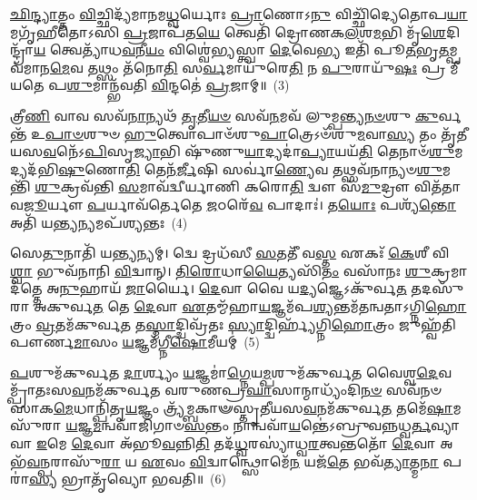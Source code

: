 \-\ul{𑌛𑌿}\-\-\ul{𑌨𑍍𑌦𑍍𑌯𑌾}\-𑌤𑍍𑌤𑌂 \ul{𑌵𑌿}\-𑌚𑍍𑌛𑌿𑌦𑍍𑌯᳴𑌮𑌾𑌨𑌮\-\ul{𑌧𑍍𑌵}\-𑌰𑍍𑌯𑍋𑌃 \ul{𑌪𑍍𑌰𑌾}\-𑌣𑍋\-𑌽\-\ul{𑌨𑍁} 𑌵𑌿𑌚𑍍𑌛𑌿᳴𑌦𑍍𑌯𑍇𑌤𑍋𑌪\-\ul{𑌯𑌾}\-𑌮𑌗𑍃᳴𑌹𑍀𑌤𑍋\-𑌽𑌸𑌿 \ul{𑌪𑍍𑌰}\-𑌜𑌾𑌪᳴𑌤\-\ul{𑌯𑍇} 𑌤𑍍𑌵𑍇𑌤𑌿᳴ 𑌦𑍍𑌰𑍋𑌣𑌕\-\ul{𑌲}\-𑌶\-\ul{𑌮}\-𑌭𑌿 𑌮𑍃᳴\-\ul{𑌶𑍇}\-𑌦𑌿𑌨𑍍𑌦𑍍𑌰𑌾᳴\-\ul{𑌯} 𑌤𑍍𑌵𑍇𑌤𑍍𑌯𑌾᳴𑌧\-\ul{𑌵}\-𑌨𑍀\-\ul{𑌯𑌂} 𑌵𑌿𑌶𑍍𑌵𑍇॑𑌭𑍍𑌯𑌸𑍍𑌤𑍍𑌵𑌾 \ul{𑌦𑍇}\-𑌵𑍇\-\ul{𑌭𑍍𑌯} 𑌇𑌤𑌿᳴ 𑌪𑍂\-\ul{𑌤}\-𑌭𑍃\-\ul{𑌤}\-𑌮𑍍𑌪𑌵᳴𑌮𑌾𑌨\-\ul{𑌮𑍇}\-𑌵 𑌤𑌥𑍍𑌸𑌂 𑌤᳴𑌨𑍋\-\ul{𑌤𑌿} 𑌸\-\ul{𑌰𑍍𑌵}\-𑌮𑌾𑌯𑍁᳴𑌰𑍇\-\ul{𑌤𑌿} 𑌨 \ul{𑌪𑍁}\-𑌰𑌾𑌯𑍁᳴\-\ul{𑌷𑌃} 𑌪𑍍𑌰 𑌮𑍀᳴𑌯𑌤𑍇 𑌪\-\ul{𑌶𑍁}\-𑌮𑌾𑌨𑍍𑌭᳴𑌵𑌤𑌿 \ul{𑌵𑌿}\-𑌨𑍍𑌦𑌤𑍇॑ \ul{𑌪𑍍𑌰}\-𑌜𑌾𑌮𑍍॥~(3)

{\anuvakamend[{\-\ul{𑌏}\-𑌤𑍇 𑌵𑌿 𑌦𑍍𑌵𑌿𑌚᳴𑌤𑍍𑌵𑌾𑌰𑌿𑍞𑌶𑌚𑍍𑌚}]}%

𑌤𑍍𑌰𑍀\-\ul{𑌣𑌿} 𑌵𑌾𑌵 𑌸𑌵᳴\-\ul{𑌨𑌾}\-𑌨𑍍𑌯𑌥᳴ \ul{𑌤𑍃}\-𑌤𑍀\-\ul{𑌯}\-\-\ul{𑍞} 𑌸𑌵᳴\-\ul{𑌨}\-𑌮𑌵᳴ 𑌲𑍁𑌮𑍍𑌪𑌨𑍍𑌤𑍍𑌯\-\ul{𑌨}\-\-\ul{𑍞}\-𑌶𑍁 \ul{𑌕𑍁}\-𑌰𑍍𑌵𑌨𑍍𑌤᳴ 𑌉\-\ul{𑌪𑌾}\-\-\ul{𑍞}\-𑌶𑍁𑍞 \ul{𑌹𑍁}\-𑌤𑍍𑌵𑍋𑌪𑌾𑍞᳴𑌶𑍁\-\ul{𑌪𑌾}\-𑌤𑍍𑌰𑍇\-𑌽𑍞᳴𑌶𑍁\-\ul{𑌮}\-𑌵𑌾\-\ul{𑌸𑍍𑌯} 𑌤𑌂 𑌤𑍃᳴𑌤𑍀𑌯𑌸\-\ul{𑌵}\-𑌨𑍇᳴\-𑌽\-\ul{𑌪𑌿}\-𑌸𑍃\-\ul{𑌜𑍍𑌯𑌾}\-𑌭𑌿 𑌷𑍁᳴𑌣𑍁\-\ul{𑌯𑌾}\-𑌦𑍍𑌯𑌦𑌾॑\-\ul{𑌪𑍍𑌯𑌾}\-𑌯𑌯᳴\-\ul{𑌤𑌿} 𑌤𑍇𑌨𑌾𑍞᳴\-\ul{𑌶𑍁}\-𑌮𑌦𑍍𑌯𑌦᳴𑌭𑌿\-\ul{𑌷𑍁}\-𑌣𑍋\-\ul{𑌤𑌿} 𑌤𑍇𑌨᳴\-\ul{𑌰𑍍𑌜𑍀}\-𑌷𑌿 𑌸𑌰𑍍𑌵𑌾॑\-\ul{𑌣𑍍𑌯𑍇}\-𑌵 𑌤𑌥𑍍𑌸𑌵᳴𑌨𑌾𑌨𑍍𑌯𑍞\-\ul{𑌶𑍁}\-𑌮𑌨𑍍𑌤𑌿᳴ \ul{𑌶𑍁}\-𑌕𑍍𑌰𑌵᳴𑌨𑍍𑌤𑌿 \ul{𑌸}\-𑌮𑌾𑌵᳴𑌦𑍍𑌵𑍀𑌰𑍍𑌯𑌾𑌣𑌿 𑌕𑌰𑍋\-\ul{𑌤𑌿} 𑌦𑍍𑌵𑍗 𑌸᳴\-\ul{𑌮𑍁}\-𑌦𑍍𑌰𑍗 𑌵𑌿𑌤᳴𑌤𑌾𑌵\-\ul{𑌜𑍂}\-𑌰𑍍𑌯𑍗 \ul{𑌪}\-𑌰𑍍𑌯𑌾𑌵᳴𑌰𑍍𑌤𑍇𑌤𑍇 \ul{𑌜}\-𑌠𑌰𑍇᳴\-\ul{𑌵} 𑌪𑌾𑌦𑌾𑌃॑। 𑌤\-\ul{𑌯𑍋𑌃} 𑌪𑌶𑍍𑌯᳴\-\ul{𑌨𑍍𑌤𑍋} 𑌅𑌤𑌿᳴ 𑌯\-\ul{𑌨𑍍𑌤𑍍𑌯}\-𑌨𑍍𑌯𑌮𑌪᳴𑌶𑍍𑌯𑌨𑍍𑌤𑌃~(4)

𑌸𑍇\-\ul{𑌤𑍁}\-𑌨𑌾𑌤𑌿᳴ 𑌯\-\ul{𑌨𑍍𑌤𑍍𑌯}\-𑌨𑍍𑌯𑌮𑍍। 𑌦𑍍𑌵𑍇 𑌦𑍍𑌰𑌧᳴𑌸𑍀 \ul{𑌸}\-𑌤𑌤𑍀᳴ 𑌵\-\ul{𑌸𑍍𑌤} 𑌏𑌕𑌃᳴ \ul{𑌕𑍇}\-𑌶𑍀 𑌵𑌿\-\ul{𑌶𑍍𑌵𑌾} 𑌭𑍁𑌵᳴𑌨𑌾𑌨𑌿 \ul{𑌵𑌿}\-𑌦𑍍𑌵𑌾𑌨𑍍। \ul{𑌤𑌿}\-\-\ul{𑌰𑍋}\-𑌧𑌾\-\ul{𑌯𑍈}\-𑌤𑍍𑌯𑌸𑌿᳴\-\ul{𑌤𑌂} 𑌵𑌸𑌾᳴𑌨𑌃 \ul{𑌶𑍁}\-𑌕𑍍𑌰𑌮𑌾 𑌦᳴𑌤𑍍𑌤𑍇 𑌅\-\ul{𑌨𑍁}\-𑌹𑌾𑌯᳴ \ul{𑌜𑌾}\-𑌰𑍍𑌯𑍈। \ul{𑌦𑍇}\-𑌵𑌾 𑌵𑍈 𑌯\-\ul{𑌦𑍍𑌯}\-𑌜𑍍𑌞𑍇\-𑌽𑌕𑍁᳴𑌰𑍍𑌵\-\ul{𑌤} 𑌤𑌦𑌸𑍁᳴𑌰𑌾 𑌅𑌕𑍁𑌰𑍍𑌵\-\ul{𑌤} 𑌤𑍇 \ul{𑌦𑍇}\-𑌵𑌾 \ul{𑌏}\-𑌤𑌮𑍍𑌮᳴𑌹𑌾\-\ul{𑌯}\-𑌜𑍍𑌞𑌮᳴𑌪\-\ul{𑌶𑍍𑌯}\-𑌨𑍍𑌤𑌮᳴𑌤𑌨𑍍𑌵𑌤𑌾\-𑌽\-𑌗𑍍𑌨𑌿\-\ul{𑌹𑍋}\-𑌤𑍍𑌰𑌂 \ul{𑌵𑍍𑌰}\-𑌤𑌮᳴𑌕𑍁𑌰𑍍𑌵\-\ul{𑌤} 𑌤\-\ul{𑌸𑍍𑌮𑌾}\-𑌦𑍍𑌦𑍍𑌵𑌿𑌵𑍍𑌰᳴𑌤𑌃 \ul{𑌸𑍍𑌯𑌾}\-𑌦𑍍𑌦𑍍𑌵𑌿𑌰𑍍\mbox{}𑌹𑍍𑌯᳴𑌗𑍍𑌨𑌿\-\ul{𑌹𑍋}\-𑌤𑍍𑌰𑌂 𑌜𑍁𑌹𑍍𑌵᳴𑌤𑌿 𑌪𑍗𑌰𑍍𑌣\-\ul{𑌮𑌾}\-𑌸𑌂 \ul{𑌯}\-𑌜𑍍𑌞𑌮᳴𑌗𑍍𑌨𑍀\-\ul{𑌷𑍋}\-𑌮𑍀𑌯𑌮𑍍॑~(5)

\-\ul{𑌪}\-𑌶𑍁𑌮᳴𑌕𑍁𑌰𑍍𑌵𑌤 \ul{𑌦𑌾}\-𑌰𑍍𑌶𑍍𑌯𑌂 \ul{𑌯}\-𑌜𑍍𑌞𑌮𑌾॑\-\ul{𑌗𑍍𑌨𑍇}\-𑌯\-\ul{𑌮𑍍𑌪}\-𑌶𑍁𑌮᳴𑌕𑍁𑌰𑍍𑌵𑌤 𑌵𑍈𑌶𑍍𑌵\-\ul{𑌦𑍇}\-𑌵𑌮𑍍𑌪𑍍𑌰𑌾᳴𑌤𑌃𑌸\-\ul{𑌵}\-𑌨𑌮᳴𑌕𑍁𑌰𑍍𑌵𑌤 𑌵𑌰𑍁𑌣𑌪𑍍𑌰\-\ul{𑌘𑌾}\-𑌸𑌾𑌨𑍍𑌮𑌾𑌧𑍍𑌯𑌂᳴𑌦𑌿\-\ul{𑌨}\-\-\ul{𑍞} 𑌸𑌵᳴𑌨𑍞 𑌸𑌾𑌕\-\ul{𑌮𑍇}\-𑌧𑌾𑌨𑍍𑌪𑌿᳴𑌤𑍃\-\ul{𑌯}\-𑌜𑍍𑌞𑌂 𑌤𑍍𑌰𑍍𑌯᳴𑌮𑍍𑌬𑌕𑌾𑍟𑌸𑍍𑌤𑍃𑌤𑍀𑌯𑌸\-\ul{𑌵}\-𑌨𑌮᳴𑌕𑍁𑌰𑍍𑌵\-\ul{𑌤} 𑌤𑌮𑍇᳴\-\ul{𑌷𑌾}\-𑌮𑌸𑍁᳴𑌰𑌾 \ul{𑌯}\-𑌜𑍍𑌞\-\ul{𑌮}\-𑌨𑍍𑌵𑌵𑌾᳴𑌜𑌿𑌗𑌾𑍞\-\ul{𑌸}\-𑌨𑍍𑌤𑌂 𑌨𑌾𑌨𑍍𑌵𑌵𑌾᳴\-\ul{𑌯}\-𑌨𑍍𑌤𑍇॑\-𑌽𑌬𑍍𑌰𑍁𑌵𑌨𑍍𑌨𑌧𑍍𑌵\-\ul{𑌰𑍍𑌤}\-𑌵𑍍𑌯𑌾 𑌵𑌾 \ul{𑌇}\-𑌮𑍇 \ul{𑌦𑍇}\-𑌵𑌾 𑌅᳴𑌭𑍂\-\ul{𑌵}\-𑌨𑍍𑌨𑌿\-\ul{𑌤𑌿} 𑌤𑌦᳴\-\ul{𑌧𑍍𑌵}\-𑌰𑌸𑍍𑌯𑌾॑𑌧𑍍𑌵\-\ul{𑌰}\-𑌤𑍍𑌵𑌨𑍍𑌤𑌤𑍋᳴ \ul{𑌦𑍇}\-𑌵𑌾 𑌅𑌭᳴\-\ul{𑌵}\-𑌨𑍍𑌪𑌰𑌾𑌸𑍁᳴\-\ul{𑌰𑌾} 𑌯 \ul{𑌏}\-𑌵𑌂 \ul{𑌵𑌿}\-𑌦𑍍𑌵𑌾𑌨𑍍𑌥𑍍𑌸𑍋𑌮𑍇᳴\-\ul{𑌨} 𑌯𑌜᳴\-\ul{𑌤𑍇} 𑌭𑌵᳴\-\ul{𑌤𑍍𑌯𑌾}\-𑌤𑍍𑌮\-\ul{𑌨𑌾} 𑌪𑌰𑌾॑\-\ul{𑌸𑍍𑌯} 𑌭𑍍𑌰𑌾𑌤𑍃᳴𑌵𑍍𑌯𑍋 𑌭𑌵𑌤𑌿॥~(6)

